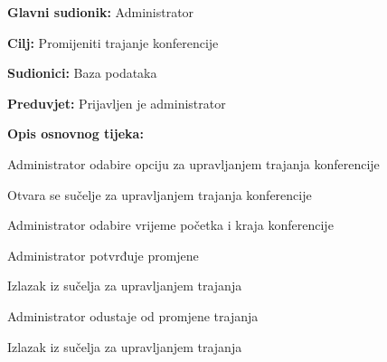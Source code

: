 					\noindent {}
					\begin{packed_item}
						
						\item \textbf{Glavni sudionik: }Administrator
						\item  \textbf{Cilj:} Promijeniti trajanje konferencije
						\item  \textbf{Sudionici:} Baza podataka
						\item  \textbf{Preduvjet:} Prijavljen je administrator
						\item  \textbf{Opis osnovnog tijeka:}
						
						\item[] \begin{packed_enum}
							
							\item Administrator odabire opciju za upravljanjem trajanja konferencije
							\item Otvara se sučelje za upravljanjem trajanja konferencije
							\item Administrator odabire vrijeme početka i kraja konferencije
							\item Administrator potvrđuje promjene
							\item Izlazak iz sučelja za upravljanjem trajanja
						\end{packed_enum}
						
						\item[] \begin{packed_item}
							
							\item[4.a] Administrator odustaje od promjene trajanja
							\item[] \begin{packed_enum}
								
								\item Izlazak iz sučelja za upravljanjem trajanja
								
							\end{packed_enum}
							
						\end{packed_item}
						
					\end{packed_item}
					

